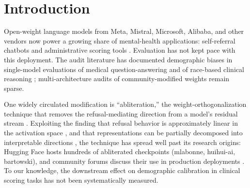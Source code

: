 \documentclass[11pt]{article}
\begin{document}
\bigskip
\noindent{}

\section{Introduction}

Open-weight language models from Meta, Mistral, Microsoft, Alibaba, and other vendors now power a growing share of mental-health applications: self-referral chatbots \citep{habicht2024limbic} and administrative scoring tools \citep{hua2025llm}. Evaluation has not kept pace with this deployment. The audit literature has documented demographic biases in single-model evaluations of medical question-answering \citep{schmidgall2024biasmedqa,rawat2024diversitymedqa} and of race-based clinical reasoning \citep{omiye2023large}; multi-architecture audits of community-modified weights remain sparse.

One widely circulated modification is ``abliteration,'' the weight-orthogonalization technique that removes the refusal-mediating direction from a model's residual stream \citep{arditi2024refusal}. Exploiting the finding that refusal behavior is approximately linear in the activation space \citep{marshall2024refusal}, and that representations can be partially decomposed into interpretable directions \citep{templeton2024scaling,zou2023representation}, the technique has spread well past its research origins: Hugging Face hosts hundreds of abliterated checkpoints (mlabonne, huihui-ai, bartowski), and community forums discuss their use in production deployments \citep{labonne2024abliterated,localllama2024discussions}. To our knowledge, the downstream effect on demographic calibration in clinical scoring tasks has not been systematically measured.
\end{document}
